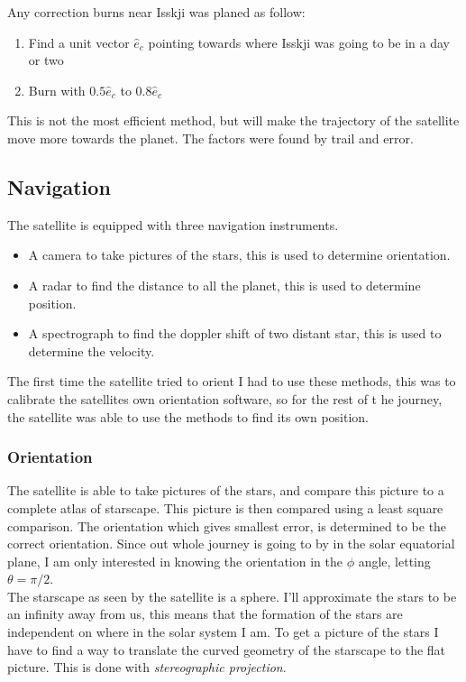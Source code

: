 \documentclass[a4paper, 10pt]{article}
\begin{document}
Any correction burns near Isskji was planed as follow:

\begin{enumerate}
\item Find a unit vector $\hat{e}_{c}$ pointing towards where Isskji was going to be in a day or two
\item Burn with $0.5\hat{e}_{c} $ to $ 0.8\hat{e}_{c}$
\end{enumerate}

This is not the most efficient method, but will make the trajectory of the satellite move more towards the planet. The factors were found by trail and error. 


\subsection{Navigation}
The satellite is equipped with three navigation instruments.

\begin{itemize}
\item A camera to take pictures of the stars, this is used to determine orientation.
\item A radar to find the distance to all the planet, this is used to determine position.
\item A spectrograph to find the doppler shift of two distant star, this is used to determine the velocity. 
\end{itemize}

The first time the satellite tried to orient I had to use these methods, this was to calibrate the satellites own orientation software, so for the rest of t he journey, the satellite was able to use the methods to find its own position.

\subsubsection{Orientation}
The satellite is able to take pictures of the stars, and compare this picture to a complete atlas of starscape. This picture is then compared using a least square comparison. The orientation which gives smallest error, is determined to be the correct orientation. Since out whole journey is going to by in the solar equatorial plane, I am only interested in knowing the orientation in the $\phi$ angle, letting $\theta = \pi /2$.\\

The starscape as seen by the satellite is a sphere. I'll approximate the stars to be an infinity away from us, this means that the formation of the stars are independent on where in the solar system I am. To get a picture of the stars I have to find a way to translate the curved geometry of the starscape to the flat picture. This is done with \textit{stereographic projection}\cite{part4}.\\
\end{document}
